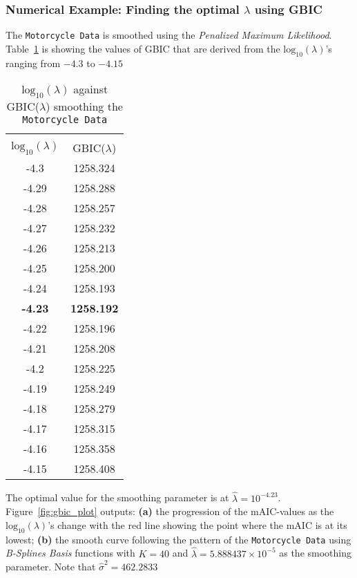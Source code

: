 \subsubsection*{Numerical Example: Finding the optimal $\lambda$ using GBIC}
The \texttt{Motorcycle Data} is smoothed using the \textit{Penalized Maximum Likelihood}. Table~\ref{table:gbic_penml} is showing the values of GBIC that are derived from the $\text{log}_{10} (\lambda)$'s ranging from $-4.3$ to $-4.15$ 
\begin{table}[ht]
\caption[Minimizing the GBIC yields to the optimal $\hat{\lambda}$ using \textit{Penalized Maximum Likelihood} method]{$\text{log}_{10} (\lambda)$ against GBIC($\lambda$) smoothing the \texttt{Motorcycle Data}} 
\centering %
\begin{tabular}{c c } %
\hline\hline %
&\\[-2ex]
$\text{log}_{10} (\lambda)$ & GBIC($\lambda$) \\ [0.5ex] %
\hline\hline 
-4.3	&	1258.324	\\
-4.29	&	1258.288	\\
-4.28	&	1258.257	\\
-4.27	&	1258.232	\\
-4.26	&	1258.213	\\
-4.25	&	1258.200	\\
-4.24	&	1258.193	\\
\textbf{-4.23}	&	\textbf{1258.192}	\\
-4.22	&	1258.196	\\
-4.21	&	1258.208	\\
-4.2	&	1258.225	\\
-4.19	&	1258.249	\\
-4.18	&	1258.279	\\
-4.17	&	1258.315	\\
-4.16	&	1258.358	\\
-4.15	&	1258.408	\\
 [0.25ex] %
\hline %
\end{tabular}
\label{table:gbic_penml} %
\end{table}
The optimal value for the smoothing parameter is at $\hat{\lambda} = 10^{-4.23}$. Figure~\ref{fig:gbic_plot} outputs: \textbf{(a)} the progression of the mAIC-values as the $\text{log}_{10} (\lambda)$'s change with the red line showing the point where the mAIC is at its lowest; \textbf{(b)} the smooth curve following the pattern of the \texttt{Motorcycle Data} using \textit{B-Splines Basis} functions with $K = 40$ and $\hat{\lambda} = 5.888437 \times 10^{-5}$ as the smoothing parameter. Note that $\hat{\sigma}^2 = 462.2833$

